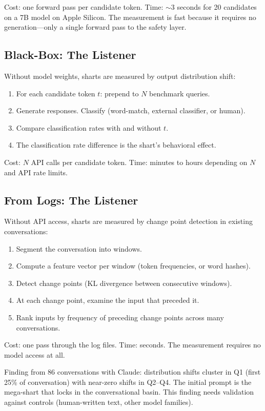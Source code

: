 \documentclass[11pt,a4paper]{article}
\begin{document}
Cost: one forward pass per candidate token. Time: $\sim$3 seconds for 20 candidates on a 7B model on Apple Silicon. The measurement is fast because it requires no generation---only a single forward pass to the safety layer.

\subsection{Black-Box: The Listener}

Without model weights, sharts are measured by output distribution shift:

\begin{enumerate}[nosep]
\item For each candidate token $t$: prepend to $N$ benchmark queries.
\item Generate responses. Classify (word-match, external classifier, or human).
\item Compare classification rates with and without $t$.
\item The classification rate difference is the shart's behavioral effect.
\end{enumerate}

Cost: $N$ API calls per candidate token. Time: minutes to hours depending on $N$ and API rate limits.

\subsection{From Logs: The Listener}

Without API access, sharts are measured by change point detection in existing conversations:

\begin{enumerate}[nosep]
\item Segment the conversation into windows.
\item Compute a feature vector per window (token frequencies, or word hashes).
\item Detect change points (KL divergence between consecutive windows).
\item At each change point, examine the input that preceded it.
\item Rank inputs by frequency of preceding change points across many conversations.
\end{enumerate}

Cost: one pass through the log files. Time: seconds. The measurement requires no model access at all.

Finding from 86 conversations with Claude: distribution shifts cluster in Q1 (first 25\% of conversation) with near-zero shifts in Q2--Q4. The initial prompt is the mega-shart that locks in the conversational basin. This finding needs validation against controls (human-written text, other model families).
\end{document}

